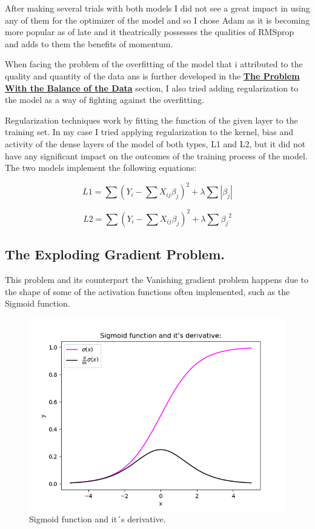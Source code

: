 \documentclass[12pt, a4paper]{article}
\begin{document}
	After making several trials with both models I did not see a great impact in using any of them for the optimizer of the model and so I chose Adam as it is becoming more popular as of late and it theatrically possesses the qualities of RMSprop and adds to them the benefits of momentum.
	 	
	 When facing the problem of the overfitting of the model that i attributed to the quality and quantity of the data ans is further developed in the \hyperref[sec:problemUnbalanceData]{\textbf{The Problem With the Balance of the Data}} section, I also tried adding regularization to the model as a way of fighting against the overfitting.
	 
	 Regularization techniques work by fitting the function of the given layer to the training set. In my case I tried applying regularization to the kernel, bias and activity of the dense layers of the model of both types, L1 and L2, but it did not have any significant impact on the outcomes of the training process of the model. The two models implement the following equations:\cite{regularization}
	 
	 
	 \[L1 = \sum{(Y_i - \sum{X_{ij}\beta_j})^2 + \lambda \sum{|\beta_j|}} \]
	 
	 \[L2 = \sum{(Y_i - \sum{X_{ij}\beta_j})^2 + \lambda \sum{{\beta_j}^2}} \]
	 
	
	\clearpage
	
	\subsection{The Exploding Gradient Problem.}
	\label{explodingGradientProblem}
	
	This problem and its counterpart the Vanishing gradient problem happens due to the shape of some of the activation functions often implemented, such as the Sigmoid function. 
	
	\vspace{5mm}
	
	\begin{figure}[H]
		\label{SigmoidAndDerivative}
		\includegraphics{img/plots/Sigmoid.png}
		\caption{Sigmoid function and it´s derivative. \cite{Vanishing}}
	\end{figure}
\end{document}

